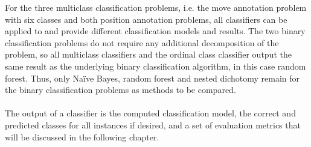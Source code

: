 \documentclass[article,type=msc,colorback,accentcolor=tud7b]{tudthesis}
\begin{document}
    For the three multiclass classification problems, i.e. the move annotation problem with six classes and both position annotation problems, all classifiers can be applied to and provide different classification models and results. The two binary classification problems do not require any additional decomposition of the problem, so all multiclass classifiers and the ordinal class classifier output the same result as the underlying binary classification algorithm, in this case random forest. Thus, only Naïve Bayes, random forest and nested dichotomy remain for the binary classification problems as methods to be compared. \\\\
    The output of a classifier is the computed classification model, the correct and predicted classes for all instances if desired, and a set of evaluation metrics that will be discussed in the following chapter.
\end{document}
